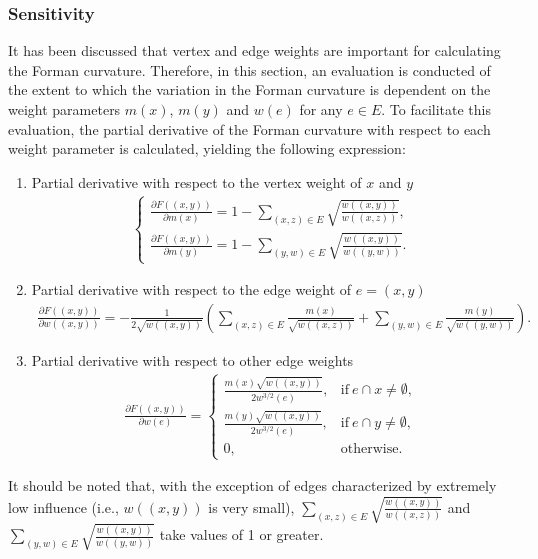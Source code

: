 \documentclass[preprint,12pt,number]{elsarticle}
\theoremstyle{plain} %
\theoremstyle{definition} %
\begin{document}
\subsubsection{Sensitivity}
It has been discussed that vertex and edge weights are important for calculating the Forman curvature. Therefore, in this section, an evaluation is conducted of the extent to which the variation in the Forman curvature is dependent on the weight parameters $m(x)$, $m(y)$ and $w(e)$ for any $e \in E$. To facilitate this evaluation, the partial derivative of the Forman curvature with respect to each weight parameter is calculated, yielding the following expression:
\begin{enumerate}
    \item Partial derivative with respect to the vertex weight of $x$ and $y$
        \begin{eqnarray*}
            \begin{cases}
                \frac{\partial F((x,y))}{\partial m(x)} = 1 - \sum_{(x,z) \in E} \sqrt{\frac{w((x,y))}{w((x,z))}},\\
                \frac{\partial F((x,y))}{\partial m(y)} = 1 - \sum_{(y,w) \in E} \sqrt{\frac{w((x,y))}{w((y,w))}}.
            \end{cases}
        \end{eqnarray*}
    \item Partial derivative with respect to the edge weight of $e=(x,y)$
        \begin{eqnarray*}
            \frac{\partial F((x,y))}{\partial w((x,y))} = - \frac{1}{2\sqrt{w((x,y))}}\left(\sum_{(x,z) \in E} \frac{m(x)}{\sqrt{w((x,z))}} + \sum_{(y,w) \in E} \frac{m(y)}{\sqrt{w((y,w))}}\right).
        \end{eqnarray*}
    \item Partial derivative with respect to other edge weights
        \begin{eqnarray*}
        \frac{\partial F((x,y))}{\partial w(e)} =
            \begin{cases}
                 \frac{m(x)\sqrt{w((x,y))}}{2 w^{3/2}(e)},& \text{if}\ e \cap x \neq \emptyset,\\
                 \frac{m(y)\sqrt{w((x,y))}}{2 w^{3/2}(e)},& \text{if}\ e \cap y \neq \emptyset,\\
                 0,& \text{otherwise}.
            \end{cases}
        \end{eqnarray*}
\end{enumerate}
It should be noted that, with the exception of edges characterized by extremely low influence (i.e., $w((x,y))$ is very small), $\sum_{(x,z) \in E} \sqrt{\frac{w((x,y))}{w((x,z))}}$ and $\sum_{(y,w) \in E} \sqrt{\frac{w((x,y))}{w((y,w))}}$ take values of 1 or greater. 
\end{document}
